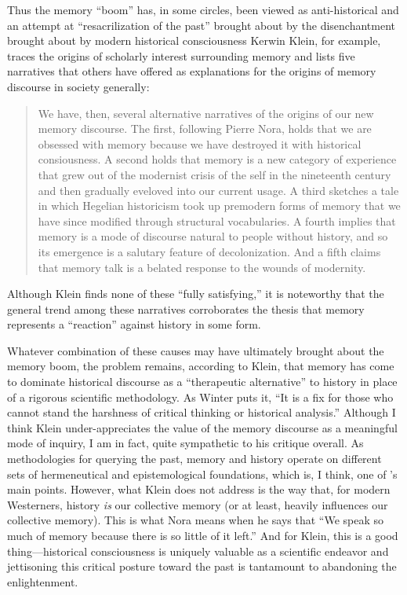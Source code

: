 Thus the memory ``boom'' has, in some circles, been viewed as
anti-historical and an attempt at ``resacrilization of the past''
brought about by the disenchantment brought about by modern historical
consciousness\autocite[282]{winter2006} Kerwin Klein, for example,
traces the origins of scholarly interest surrounding memory and lists
five narratives that others have offered as explanations for the origins
of memory discourse in society generally:

\begin{quote}
We have, then, several alternative narratives of the origins of our new
memory discourse. The first, following Pierre Nora, holds that we are
obsessed with memory because we have destroyed it with historical
consiousness. A second holds that memory is a new category of experience
that grew out of the modernist crisis of the self in the nineteenth
century and then gradually eveloved into our current usage. A third
sketches a tale in which Hegelian historicism took up premodern forms of
memory that we have since modified through structural vocabularies. A
fourth implies that memory is a mode of discourse natural to people
without history, and so its emergence is a salutary feature of
decolonization. And a fifth claims that memory talk is a belated
response to the wounds of modernity.\autocite[134]{klein_klein2011}
\end{quote}

Although Klein finds none of these ``fully satisfying,'' it is
noteworthy that the general trend among these narratives corroborates
the thesis that memory represents a ``reaction'' against history in some
form.

Whatever combination of these causes may have ultimately brought about
the memory boom, the problem remains, according to Klein, that memory
has come to dominate historical discourse as a ``therapeutic
alternative'' to history in place of a rigorous scientific
methodology.\autocite[137]{klein2011} As Winter puts it, ``It is a fix
for those who cannot stand the harshness of critical thinking or
historical analysis.''\autocite[283 (summarizing Klein)]{winter2006}
Although I think Klein under-appreciates the value of the memory
discourse as a meaningful mode of inquiry, I am in fact, quite
sympathetic to his critique overall. As methodologies for querying the
past, memory and history operate on different sets of hermeneutical and
epistemological foundations, which is, I think, one of
\yerushalmi's main points. However, what Klein does not
address is the way that, for modern Westerners, history \emph{is} our
collective memory (or at least, heavily influences our collective
memory). This is what Nora means when he says that ``We speak so much of
memory because there is so little of it
left.''\autocite[7]{nora_representations1989} And for Klein, this is a
good thing---historical consciousness is uniquely valuable as a
scientific endeavor and jettisoning this critical posture toward the
past is tantamount to abandoning the enlightenment.

